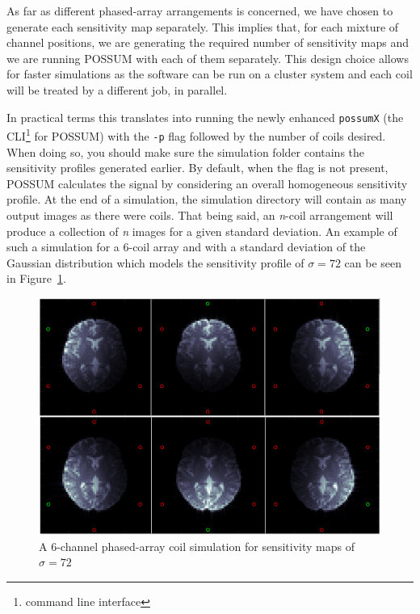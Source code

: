 As far as different phased-array arrangements is concerned, we have chosen to generate each sensitivity map separately. This implies that, for each mixture of channel positions, we are generating the required number of sensitivity maps and we are running POSSUM with each of them separately. This design choice allows for faster simulations as the software can be run on a cluster system and each coil will be treated by a different job, in parallel.

In practical terms this translates into running the newly enhanced \texttt{possumX} (the CLI\footnote{command line interface} for POSSUM) with the \texttt{-p} flag followed by the number of coils desired. When doing so, you should make sure the simulation folder contains the sensitivity profiles generated earlier. By default, when the flag is not present, POSSUM calculates the signal by considering an overall homogeneous sensitivity profile. At the end of a simulation, the simulation directory will contain as many output images as there were coils. That being said, an \textit{n}-coil arrangement will produce a collection of \textit{n} images for a given standard deviation. An example of such a simulation for a 6-coil array and with a standard deviation of the Gaussian distribution which models the sensitivity profile of $\sigma = 72$ can be seen in Figure~\ref{fig:brains1sigma}.

\begin{figure}[H]
    \centering
    \includegraphics[width=1\textwidth,keepaspectratio]{brains1sigma}
    \caption{A 6-channel phased-array coil simulation for sensitivity maps of $\sigma = 72$}
    \label{fig:brains1sigma}
\end{figure}

